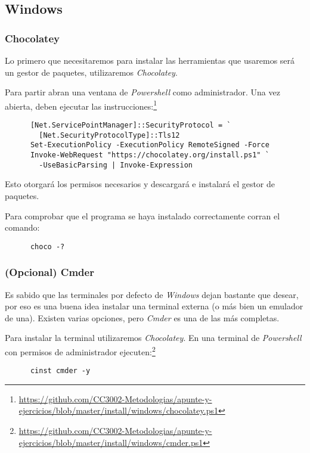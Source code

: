 \subsection{Windows}
  \subsubsection{Chocolatey}
    Lo primero que necesitaremos para instalar las herramientas que usaremos será un gestor de 
    paquetes, utilizaremos \textit{Chocolatey}.\autocite{choco}

    Para partir abran una ventana de \textit{Powershell} como administrador.
    Una vez abierta, deben ejecutar las instrucciones:\footnote{
      \url{https://github.com/CC3002-Metodologias/apunte-y-ejercicios/blob/master/install/windows/chocolatey.ps1}
    }
    \begin{verbatim}
      [Net.ServicePointManager]::SecurityProtocol = `
        [Net.SecurityProtocolType]::Tls12
      Set-ExecutionPolicy -ExecutionPolicy RemoteSigned -Force
      Invoke-WebRequest "https://chocolatey.org/install.ps1" `
        -UseBasicParsing | Invoke-Expression
    \end{verbatim}

    Esto otorgará los permisos necesarios y descargará e instalará el gestor de paquetes.

    Para comprobar que el programa se haya instalado correctamente corran el comando:
    \begin{verbatim}
      choco -?
    \end{verbatim}

  \subsubsection{(Opcional) Cmder}
    Es sabido que las terminales por defecto de \textit{Windows} dejan bastante que desear, 
    por eso es una buena idea instalar una terminal externa (o más bien un emulador de una).
    Existen varias opciones, pero \textit{Cmder} es una de las más completas.

    Para instalar la terminal utilizaremos \textit{Chocolatey}.
    En una terminal de \textit{Powershell} con permisos de administrador ejecuten:\footnote{
      \url{https://github.com/CC3002-Metodologias/apunte-y-ejercicios/blob/master/install/windows/cmder.ps1}
    }

    \begin{verbatim}
      cinst cmder -y
    \end{verbatim}

